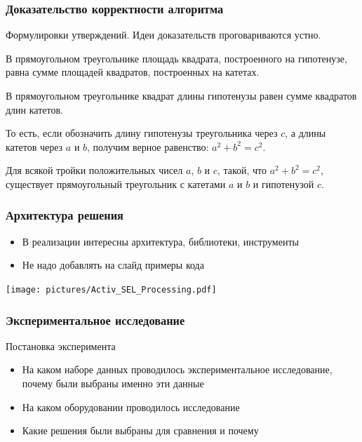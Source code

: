 \documentclass[aspectratio=169]{beamer}
\begin{document}
\begin{frame}[fragile]
	\frametitle{Доказательство корректности алгоритма}
	{\tiny Формулировки утверждений. Идеи доказательств проговариваются устно.}
	\begin{rutheorem}
		В прямоугольном треугольнике площадь квадрата, построенного на гипотенузе, равна сумме площадей квадратов, построенных на катетах.
	\end{rutheorem}

	\begin{rutheorem}
		В прямоугольном треугольнике квадрат длины гипотенузы равен сумме квадратов длин катетов.

		То есть, если обозначить длину гипотенузы треугольника через $c$, а длины катетов
		через $a$ и $b$, получим верное равенство: $a^2 + b^2 = c^2$.
	\end{rutheorem}

	\begin{rutheorem}
		Для всякой тройки положительных чисел $a$, $b$ и $c$, такой, что $a^2 + b^2 = c^2$, существует прямоугольный треугольник с катетами $a$ и $b$ и гипотенузой $c$.
	\end{rutheorem}
\end{frame}

\begin{frame}[fragile]
	\frametitle{Архитектура решения}
	\begin{itemize}
		\item В реализации интересны архитектура, библиотеки, инструменты
		\item Не надо добавлять на слайд примеры кода
	\end{itemize}
	\begin{center}
		\texttt{[image: pictures/Activ\_SEL\_Processing.pdf]}
	\end{center}
\end{frame}

\begin{frame}[t]
	\frametitle{Экспериментальное исследование}
	Постановка эксперимента
	\begin{itemize}
		\item На каком наборе данных проводилось экспериментальное исследование, почему были выбраны именно эти данные
		\item На каком оборудовании проводилось исследование
		\item Какие решения были выбраны для сравнения и почему
	\end{itemize}
\end{frame}
\end{document}
